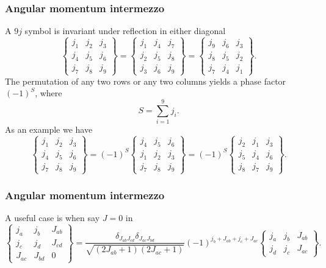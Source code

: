 \documentclass[compress]{beamer}
\begin{document}
\frame
{
\frametitle{Angular momentum intermezzo}
\begin{small}
{\scriptsize
A $9j$ symbol is invariant under reflection in either diagonal
\[
    \begin{Bmatrix} j_1 & j_2 & j_3\\ j_4 & j_5 & j_6\\ j_7 & j_8 & j_9 \end{Bmatrix} = \begin{Bmatrix} j_1 & j_4 & j_7\\ j_2 & j_5 & j_8\\ j_3 & j_6 & j_9 \end{Bmatrix} = \begin{Bmatrix} j_9 & j_6 & j_3\\ j_8 & j_5 & j_2\\ j_7 & j_4 & j_1 \end{Bmatrix}. 
\]
The permutation of any two rows or any two columns yields a phase factor $(-1)^S$, where
\[
    S=\sum_{i=1}^9 j_i. 
\]
As an  example we have
\[
    \begin{Bmatrix} j_1 & j_2 & j_3\\ j_4 & j_5 & j_6\\ j_7 & j_8 & j_9 \end{Bmatrix} = (-1)^S \begin{Bmatrix} j_4 & j_5 & j_6\\ j_1 & j_2 & j_3\\ j_7 & j_8 & j_9 \end{Bmatrix} = (-1)^S \begin{Bmatrix} j_2 & j_1 & j_3\\ j_5 & j_4 & j_6\\ j_8 & j_7 & j_9 \end{Bmatrix}. 
\]
}
\end{small}
}



\frame
{
\frametitle{Angular momentum intermezzo}
\begin{small}
{\scriptsize
A useful case is when say $J=0$ in 
\[
\left\{\begin{array}{ccc} j_a & j_b& J_{ab} \\ j_c & j_d & J_{cd} \\ J_{ac} & J_{bd}& 0\end{array}\right\}=\frac{\delta_{J_{ab}J_{cd}} \delta_{J_{ac}J_{bd}}}{\sqrt{(2J_{ab}+1)(2J_{ac}+1)}} (-1)^{j_b+J_{ab}+j_c+J_{ac}} \begin{Bmatrix} j_a & j_b & J_{ab}\\ j_d & j_c & J_{ac} \end{Bmatrix}. 
\]
}
\end{small}
}
\end{document}
